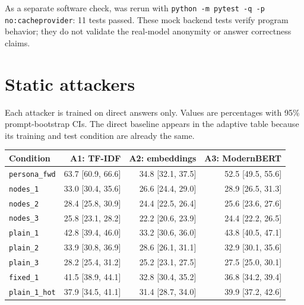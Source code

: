 \documentclass[11pt]{article}
\begin{document}
As a separate software check,  was rerun with
\texttt{python -m pytest -q -p no:cacheprovider}: 11 tests passed. These mock
backend tests verify program behavior; they do not validate the real-model
anonymity or answer correctness claims.

\clearpage
\appendix
\section{Static attackers}
Each attacker is trained on direct answers only. Values are percentages with
95\% prompt-bootstrap CIs. The direct baseline appears in the adaptive table
because its training and test condition are already the same.
\begin{center}
\small
\begin{tabular}{lrrr}
\toprule
Condition & A1: TF-IDF & A2: embeddings & A3: ModernBERT \\
\midrule
\texttt{persona\_fwd} & 63.7 [60.9, 66.6] & 34.8 [32.1, 37.5] & 52.5 [49.5, 55.6] \\
\texttt{nodes\_1} & 33.0 [30.4, 35.6] & 26.6 [24.4, 29.0] & 28.9 [26.5, 31.3] \\
\texttt{nodes\_2} & 28.4 [25.8, 30.9] & 24.4 [22.5, 26.4] & 25.6 [23.6, 27.6] \\
\texttt{nodes\_3} & 25.8 [23.1, 28.2] & 22.2 [20.6, 23.9] & 24.4 [22.2, 26.5] \\
\texttt{plain\_1} & 42.8 [39.4, 46.0] & 33.2 [30.6, 36.0] & 43.8 [40.5, 47.1] \\
\texttt{plain\_2} & 33.9 [30.8, 36.9] & 28.6 [26.1, 31.1] & 32.9 [30.1, 35.6] \\
\texttt{plain\_3} & 28.2 [25.4, 31.2] & 25.2 [23.1, 27.5] & 27.5 [25.0, 30.1] \\
\texttt{fixed\_1} & 41.5 [38.9, 44.1] & 32.8 [30.4, 35.2] & 36.8 [34.2, 39.4] \\
\texttt{plain\_1\_hot} & 37.9 [34.5, 41.1] & 31.4 [28.7, 34.0] & 39.9 [37.2, 42.6] \\
\bottomrule
\end{tabular}
\end{center}
\end{document}
